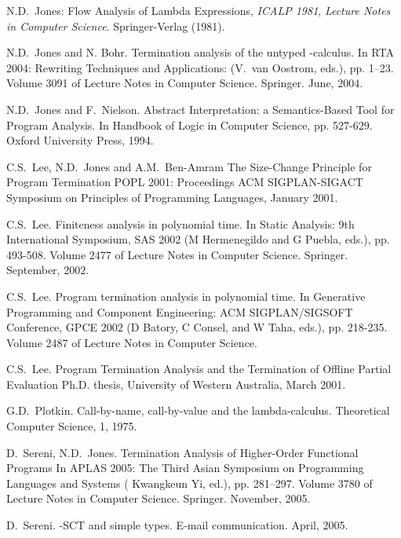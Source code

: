 \documentclass{LMCS}
\theoremstyle{definition}\newtheorem{env}[thm]{Environment}
\begin{document}
\begin{thebibliography}{MMM}
N.D.\ Jones: Flow Analysis of Lambda Expressions, 
{\em ICALP 1981}, {\em Lecture  Notes in Computer Science}. Springer-Verlag (1981).


N.D.\ Jones and N. Bohr.
Termination analysis of the untyped -calculus. 
In RTA 2004: Rewriting Techniques and Applications: 
(V.\ van Oostrom, eds.), pp. 1--23. Volume 3091 of Lecture 
Notes in Computer Science. Springer. June, 2004. 


N.D.\ Jones and F.\ Nielson.
Abstract Interpretation: 
a Semantics-Based Tool for Program Analysis. 
In Handbook of Logic in Computer Science, pp. 527-629. 
Oxford University Press, 1994.  

C.S.\  Lee, N.D.\ Jones and A.M.\ Ben-Amram
\newblock The Size-Change Principle for Program Termination
\newblock POPL 2001: Proceedings  ACM SIGPLAN-SIGACT Symposium on
          Principles of Programming Languages, January 2001.



C.S.\  Lee.
Finiteness analysis in polynomial time. 
In Static Analysis: 9th International Symposium, SAS 2002 
(M Hermenegildo and G Puebla, eds.), pp. 493-508. Volume 2477 of Lecture 
Notes in Computer Science. Springer. September, 2002. 

C.S.\ Lee.
Program termination analysis in polynomial time.
In Generative Programming and Component Engineering:
ACM SIGPLAN/SIGSOFT Conference, GPCE 2002 
(D Batory, C Consel, and W Taha, eds.), pp. 
218-235. Volume 2487 of Lecture Notes in Computer Science.

C.S.\  Lee.
\newblock Program Termination Analysis and the Termination of Offline 
          Partial Evaluation
\newblock Ph.D. thesis, University of Western Australia, March 2001.

G.D.\ Plotkin. 
Call-by-name, call-by-value and the lambda-calculus. 
Theoretical Computer Science, 1, 1975.

D.\  Sereni, N.D.\ Jones.
Termination Analysis of Higher-Order Functional Programs
In APLAS 2005: The Third Asian Symposium on
Programming Languages and Systems 
( Kwangkeun Yi, ed.), pp. 281--297. Volume 3780 of Lecture 
Notes in Computer Science. Springer. November, 2005. 


D.\  Sereni.
-SCT and simple types.
E-mail communication. April, 2005. 


\end{thebibliography}
\end{document}
